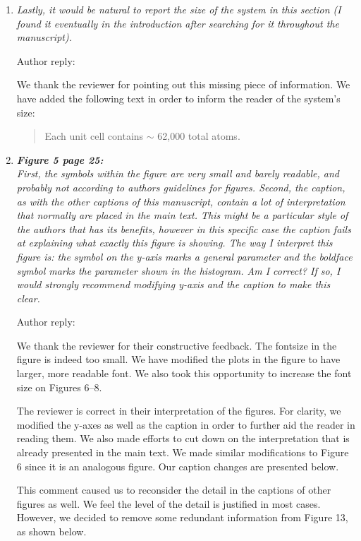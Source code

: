 \documentclass{article}
\begin{document}
\begin{enumerate}[label={Comment \theenumi :}, leftmargin=3.9\parindent]
  \item \textit{Lastly, it would be natural to report the size of the system in this
              section (I found it eventually in the introduction after searching for it 
              throughout the manuscript).}
              
              Author reply:
              
              We thank the reviewer for pointing out this missing piece of information. We
              have added the following text in order to inform the reader of the system's size:
			  \begin{quote} 
			  Each unit cell contains $\sim$ 62,000 total atoms.
			  \end{quote}
  
  \item \textit{\textbf{Figure 5 page 25:} \\
		First, the symbols within the figure are very small and barely readable, and probably not
		according to authors guidelines for figures. Second, the caption, as with the other captions of
		this manuscript, contain a lot of interpretation that normally are placed in the main text. This
		might be a particular style of the authors that has its benefits, however in this specific case the
		caption fails at explaining what exactly this figure is showing. The way I interpret this figure is:
		the symbol on the y-axis marks a general parameter and the boldface symbol marks the
		parameter shown in the histogram. Am I correct? If so, I would strongly recommend modifying
		y-axis and the caption to make this clear.}
		
		Author reply:
		
		We thank the reviewer for their constructive feedback. The fontsize in the figure is indeed too small.
		We have modified the plots in the figure to have larger, more readable font. We also took this 
		opportunity to increase the font size on Figures 6--8.
		
		The reviewer is correct in their interpretation of the figures. For clarity, we modified the y-axes as
		well as the caption in order to further aid the reader in reading them. We also made efforts to cut
        down on the interpretation that is already presented in the main text. We made similar modifications
        to Figure 6 since it is an analogous figure. Our caption changes are presented below.
		
		This comment caused us to reconsider the detail in the captions of other figures as well. We feel
		the level of the detail is justified in most cases. However, we decided to remove some redundant
		information from Figure 13, as shown below.
		

\end{enumerate}
\end{document}
